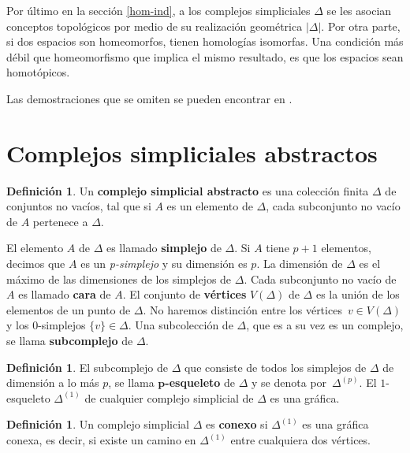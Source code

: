 \documentclass[12pt]{book}
\theoremstyle{definition}
\newtheorem{definition}[theorem]{Definición}
\newcounter{in}
\newcounter{ini}
\begin{document}
Por último en la sección \ref{hom-ind}, a los complejos simpliciales
$\Delta$ se les asocian conceptos topológicos por medio de su
realización geométrica $|\Delta|$. Por otra parte, si dos espacios son
homeomorfos, tienen homologías isomorfas. Una condición más débil que
homeomorfismo que implica el mismo resultado, es que los espacios
sean homotópicos.

Las demostraciones que se omiten se pueden encontrar en
\cite{munkres1984elements}.

\section{Complejos simpliciales abstractos}
\label{com-sim-abs}

\begin{definition}
Un \textbf{complejo simplicial abstracto} es una colección finita
$\Delta$ de conjuntos no vacíos, tal que si $A$ es un elemento de $\Delta$,
cada subconjunto no vacío de $A$ pertenece a $\Delta$.
\end{definition}

El elemento $A$ de $\Delta$ es llamado \textbf{simplejo} de
$\Delta$. Si $A$ tiene $p+1$ elementos, decimos que $A$ es un
\emph{p-simplejo} y su dimensión es $p$. La dimensión de $\Delta$
es el máximo de las dimensiones de los simplejos de $\Delta$. Cada
subconjunto no vacío de $A$ es llamado \textbf{cara} de $A$. El
conjunto de \textbf{vértices} $V(\Delta)$ de $\Delta$ es la unión de los
elementos de un punto de $\Delta$. No haremos distinción entre los
vértices~$v\in V(\Delta)$ y los $0$-simplejos $\{v\}\in \Delta$. Una
subcolección de $\Delta$, que es a su vez es un complejo, se llama
\textbf{subcomplejo} de $\Delta$.

\begin{definition}
  El subcomplejo de $\Delta$ que consiste de todos los simplejos de
  $\Delta$ de dimensión a lo más $p$, se llama \textbf{$\boldsymbol{p}$-esqueleto} de
  $\Delta$ y se denota por~$\Delta^{(p)}$. El $1$-esqueleto
  $\Delta^{(1)}$ de cualquier complejo simplicial de $\Delta$ es una
  gráfica.
\end{definition}

\begin{definition}
  Un complejo simplicial $\Delta$ es \textbf{conexo} si
  $\Delta^{(1)}$ es una gráfica conexa, es decir, si existe un camino en
  $\Delta^{(1)}$  entre cualquiera dos vértices.
\end{definition}
\end{document}
